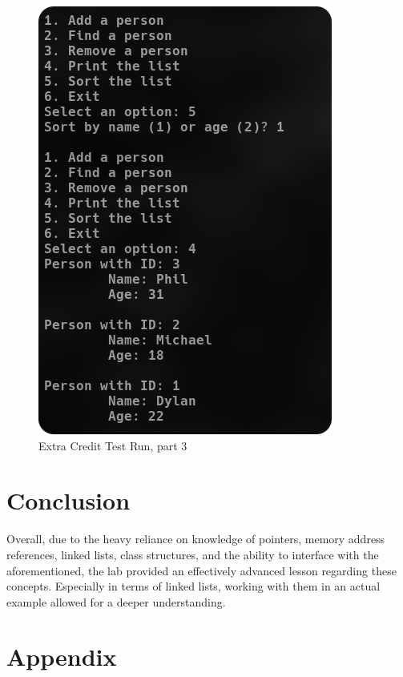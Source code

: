 \documentclass[
	letterpaper, %
	10pt, %
]{CSUniSchoolLabReport}
\begin{document}
\begin{figure}[H]
  \centering
  \includegraphics[width=.9\textwidth]{Figures/EC3.png}
  \caption{Extra Credit Test Run, part 3}
  \label{fig:3}
\end{figure}

\section{Conclusion}

Overall, due to the heavy reliance on knowledge of pointers, memory address references, linked lists, class structures, and the ability to interface with the aforementioned, the lab provided an effectively advanced lesson regarding these concepts. Especially in terms of linked lists, working with them in an actual example allowed for a deeper understanding.

\section{Appendix}


\end{document}
